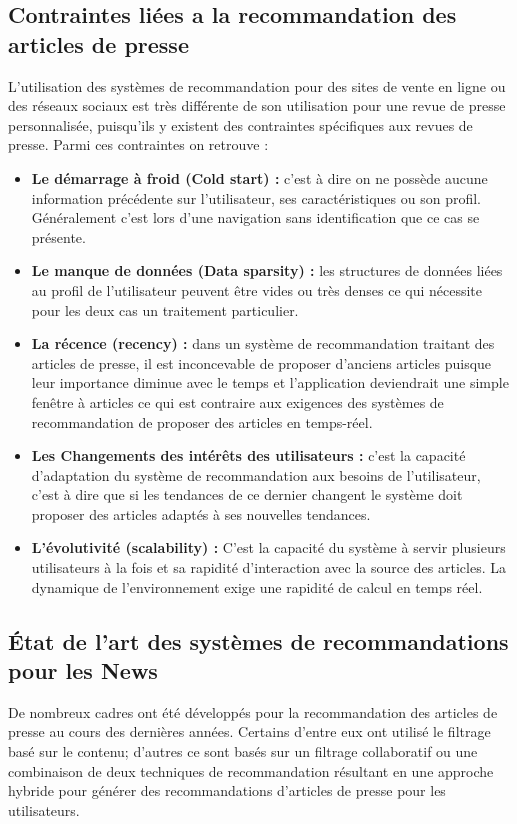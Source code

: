    \subsection*{Contraintes liées a la recommandation des articles de presse}
    L'utilisation des systèmes de recommandation pour des sites de vente en ligne ou des réseaux sociaux est très différente de son utilisation pour une revue de presse personnalisée, puisqu'ils y existent des contraintes spécifiques aux revues de presse.
    Parmi ces contraintes on retrouve :
    \begin{itemize}
        \item \textbf{Le démarrage à froid (Cold start) : }c'est à dire on ne possède aucune information précédente sur l'utilisateur, ses caractéristiques ou son profil. Généralement c'est lors d'une navigation sans identification que ce cas se présente.\\
        \item \textbf{Le manque de données (Data sparsity) : }les structures de données liées au profil de l'utilisateur peuvent être vides ou très denses ce qui nécessite pour les deux cas un traitement particulier.\\
        \item \textbf{La récence (recency) : }dans un système de recommandation traitant des articles de presse, il est inconcevable de proposer d'anciens articles puisque leur importance diminue avec le temps et l'application deviendrait une simple fenêtre à articles ce qui est contraire aux exigences des systèmes de recommandation de proposer des articles en temps-réel.\\
        \item \textbf{Les Changements des intérêts des utilisateurs : }c'est la capacité d'adaptation du système de recommandation aux besoins de l'utilisateur, c'est à dire que si les tendances de ce dernier changent le système doit proposer des articles adaptés à ses nouvelles tendances.\\
        \item \textbf{L'évolutivité (scalability) : }C'est la capacité du système à servir plusieurs utilisateurs à la fois et sa rapidité d'interaction avec la source des articles. La dynamique de l'environnement exige une rapidité de calcul en temps réel.\\ 
    \end{itemize}

    \subsection{État de l'art des systèmes de recommandations pour les News}
    De nombreux cadres ont été développés pour la recommandation des articles de presse au cours des dernières années. Certains d'entre eux ont utilisé le filtrage basé sur le contenu; d'autres ce sont basés sur un filtrage collaboratif ou une combinaison de deux techniques de recommandation résultant en une approche hybride pour générer des recommandations d'articles de presse pour les utilisateurs.\\


